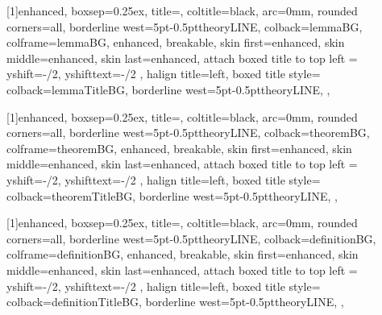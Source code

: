 

[1]{enhanced,
    boxsep=0.25ex,
    title=\textbf{},
    coltitle=black,
    arc=0mm,
    rounded corners=all,
    borderline west={5pt}{-0.5pt}{theoryLINE},
    colback=lemmaBG,
    colframe=lemmaBG,
    enhanced,
    breakable,
    skin first=enhanced,
    skin middle=enhanced,
    skin last=enhanced,
    attach boxed title to top left ={
        yshift=-\tcboxedtitleheight/2,
        yshifttext=-\tcboxedtitleheight/2
    },
    halign title=left,
    boxed title style={
        colback=lemmaTitleBG,
        borderline west={5pt}{-0.5pt}{theoryLINE},
    },
}

[1]{enhanced,
    boxsep=0.25ex,
    title=,
    coltitle=black,
    arc=0mm,
    rounded corners=all,
    borderline west={5pt}{-0.5pt}{theoryLINE},
    colback=theoremBG,
    colframe=theoremBG,
    enhanced,
    breakable,
    skin first=enhanced,
    skin middle=enhanced,
    skin last=enhanced,
    attach boxed title to top left ={
        yshift=-\tcboxedtitleheight/2,
        yshifttext=-\tcboxedtitleheight/2
    },
    halign title=left,
    boxed title style={
        colback=theoremTitleBG,
        borderline west={5pt}{-0.5pt}{theoryLINE},
    },
}

[1]{enhanced,
    boxsep=0.25ex,
    title=,
    coltitle=black,
    arc=0mm,
    rounded corners=all,
    borderline west={5pt}{-0.5pt}{theoryLINE},
    colback=definitionBG,
    colframe=definitionBG,
    enhanced,
    breakable,
    skin first=enhanced,
    skin middle=enhanced,
    skin last=enhanced,
    attach boxed title to top left ={
        yshift=-\tcboxedtitleheight/2,
        yshifttext=-\tcboxedtitleheight/2
    },
    halign title=left,
    boxed title style={
        colback=definitionTitleBG,
        borderline west={5pt}{-0.5pt}{theoryLINE},
    },
}

